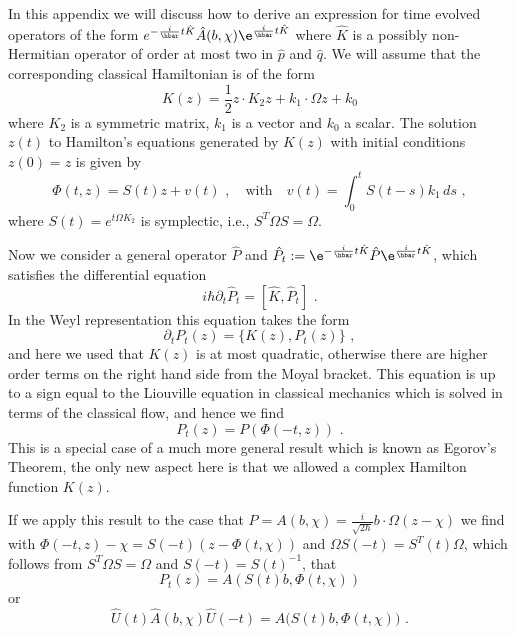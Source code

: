 \documentclass[12pt]{iopart} %
\begin{document}
In this appendix we will discuss how to derive an expression for time evolved operators of the form $e^{-\frac{i}{\hbar} t \hat K}\hat A(b,\chi)\e^{\frac{i}{\hbar}t \hat{K}}$ where $\hat K$ is a possibly non-Hermitian operator of order at most two in $\hat p$ and $\hat q$. We will assume that the corresponding classical Hamiltonian is of the form 
\begin{equation}\label{eq:complex_Ham}
K(z)=\frac{1}{2} z\cdot K_2 z+k_1\cdot \Omega z+k_0
\end{equation}
where $K_2$ is a symmetric matrix, $k_1$ is a vector and $k_0$ a scalar. The solution  $z(t)$ to Hamilton's equations generated by $K(z)$ with initial conditions $z(0)=z$ is given by 
\begin{equation}
\Phi(t,z)=S(t)z+v(t)\,\, ,\quad\text{with}\quad v(t)=\int_0^t S(t-s)k_1\, d s\,\, ,
\end{equation}
where $S(t)=e^{t\Omega K_2}$ is symplectic, i.e., $S^T\Omega S=\Omega$. 

Now we consider a general operator $\hat P$ and $\hat P_t:=\e^{-\frac{i}{\hbar} t\hat K}\hat P\e^{\frac{i}{\hbar} t\hat K}$, which satisfies the differential equation 
\begin{equation}
i\hbar \partial_t \hat P_t=[\hat K, \hat P_t]\,\, .
\end{equation}
In the Weyl representation this equation takes the form 
\begin{equation}
    \partial_t P_t(z)=\{K(z), P_t(z)\}\,\, ,
\end{equation}
and here we used that $K(z)$ is at most quadratic, otherwise there are higher order  terms on the right hand side from the Moyal bracket. This equation is up to a sign equal to the Liouville equation in classical mechanics which is solved in terms of the classical flow, and hence we find 
\begin{equation}\label{eq:Egorov}
    P_t(z)=P(\Phi(-t,z))\,\, .
\end{equation}
This is a special case of a much more general result which is known as Egorov's Theorem, the only new aspect here is that we allowed a complex Hamilton function $K(z)$. 

If we apply this result to the case that $P=A(b,\chi)=\frac{i}{\sqrt{2\hbar}} b\cdot \Omega (z-\chi)$ we find with $\Phi(-t,z)-\chi=S(-t)(z-\Phi(t,\chi))$ and $\Omega S(-t)=S^T(t)\Omega$, which follows from $S^T\Omega S=\Omega $ and $S(-t)=S(t)^{-1}$, that
\begin{equation}
P_t(z)=A(S(t)b,\Phi(t,\chi))
\end{equation}
or 
\begin{equation}\label{eq:transported-annihilation}
    \hat U(t)\hat A(b,\chi)\hat U(-t)=\hat A\big(S(t)b,\Phi(t,\chi)\big)\,\, .
\end{equation}
\end{document}
